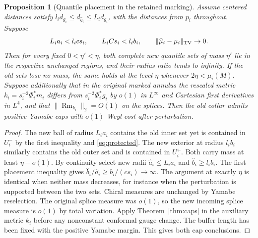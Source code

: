 \documentclass[11pt]{article}
\numberwithin{equation}{section}
\newtheorem{proposition}[theorem]{Proposition}
\theoremstyle{definition}
\theoremstyle{remark}
\newcommand{\Rm}{\operatorname{Rm}}
\begin{document}
\begin{proposition}[Quantile placement in the retained marking]
Assume centered distances satisfy
\(l_i d_{g_i}\le d_{\widehat g_i}\le L_i d_{g_i}\), with the
distances from \(p_i\) throughout. Suppose
\begin{equation}\label{eq:placement}
 L_i a_i<l_i c s_i,\qquad L_i C s_i<l_i b_i,\qquad
 \|\widehat\mu_i-\mu_i\|_{\rm TV}\to0 .
\end{equation}
Then for every fixed \(0<\eta'<\eta\), both complete new
quantile sets of mass \(\eta'\) lie in the respective
unchanged regions, and their radius ratio tends to infinity.
If the old sets lose no mass, the same holds at the level
\(\eta\) whenever \(2\eta<\widehat\mu_i(M)\).
Suppose additionally that in the original marked annulus
the rescaled metric \(k_i=s_i^{-2}\Phi_i^*m_i\) differs
from \(s_i^{-2}\Phi_i^*g_i\) by \(o(1)\) in
\(L^\infty\) and Cartesian first derivatives in \(L^4\),
and that \(\|\Rm_{k_i}\|_2=O(1)\) on the splices.
Then the old collar admits positive Yamabe caps with
\(o(1)\) Weyl cost after perturbation.
\end{proposition}
\begin{proof}
The new ball of radius \(L_i a_i\) contains the old
inner set yet is contained in \(U_i^-\) by the first
inequality and \eqref{eq:protected}. The new exterior
at radius \(l_i b_i\) similarly contains the old
outer set and is contained in \(U_i^+\). Both carry
mass at least \(\eta-o(1)\). By continuity select new
radii \(\widehat a_i\le L_i a_i\) and
\(\widehat b_i\ge l_i b_i\). The first placement
inequality gives \(\widehat b_i/\widehat a_i\ge
 b_i/(c s_i)\to\infty\). The argument at exactly \(\eta\)
is identical when neither mass decreases, for instance
when the perturbation is supported between the two sets.
Chiral measures are unchanged by Yamabe reselection.
The original splice measure was \(o(1)\), so the new
incoming splice measure is \(o(1)\) by total variation.
Apply Theorem~\ref{thm:caps} in the auxiliary metric
\(k_i\) before any nonconstant conformal gauge change.
The buffer length has been fixed with the positive
Yamabe margin. This gives both cap conclusions.
\end{proof}
\end{document}
